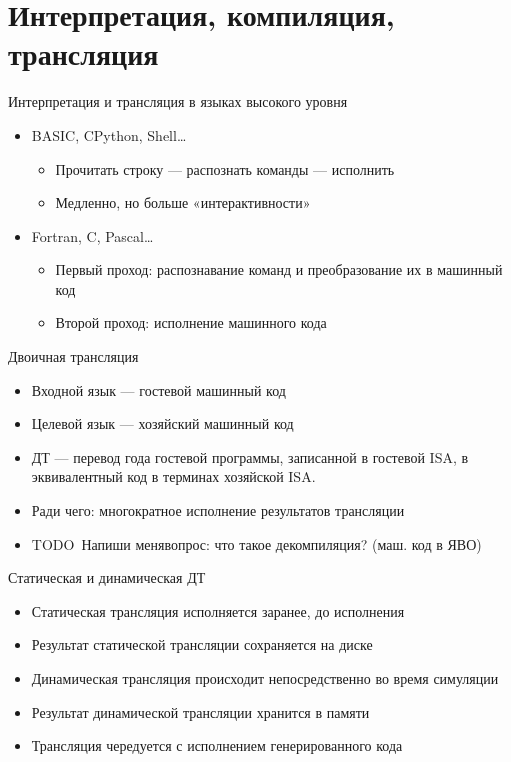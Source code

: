 \documentclass{beamer}
\newcommand{\todo}[1][Напиши меня]{{\color{red}TODO\ #1}}
\begin{document}
\section{Интерпретация, компиляция, трансляция}

\begin{frame}{Интерпретация и трансляция в языках высокого уровня}
\begin{itemize}
\item BASIC, CPython, Shell\dots
    \begin{itemize}
    \item Прочитать строку — распознать команды — исполнить
    \item Медленно, но больше «интерактивности»
    \end{itemize}
\item Fortran, C, Pascal\dots
    \begin{itemize}
    \item Первый проход: распознавание команд и преобразование их в машинный код
    \item Второй проход: исполнение машинного кода
    \end{itemize}
\end{itemize}
\end{frame}

\begin{frame}{Двоичная трансляция}
\begin{itemize}
\item Входной язык — гостевой машинный код
\item Целевой язык — хозяйский машинный код
\item ДТ — перевод года гостевой программы, записанной в гостевой ISA, в эквивалентный код в терминах хозяйской ISA.
\item Ради чего: многократное исполнение результатов трансляции
\item \todo вопрос: что такое декомпиляция? (маш. код в ЯВО)
\end{itemize}
\end{frame}

\begin{frame}{Статическая и динамическая ДТ}
\begin{itemize}
    \item Статическая трансляция исполняется заранее, до исполнения
    \item Результат статической трансляции сохраняется на диске
    \item Динамическая трансляция происходит непосредственно во время симуляции
    \item Результат динамической трансляции хранится в памяти
    \item Трансляция чередуется с исполнением генерированного кода
\end{itemize}

\end{frame}
\end{document}
